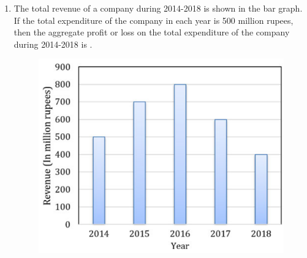 \documentclass[journal,12pt,onecolumn]{IEEEtran}
\theoremstyle{remark}
\begin{document}
\begin{enumerate}
		\item The total revenue of a company during 2014-2018 is shown in the bar graph. If the total expenditure of the company in each year is 500 million rupees, then the aggregate profit or loss  on the total expenditure of the company during 2014-2018 is \underline{\hspace{2cm}}.
		\begin{figure}[H]
			\centering
			\includegraphics[width=0.6\linewidth]{figs/3}
			\caption{}
			\label{fig:3}
		\end{figure}
		
		
		\hfill{}
		\begin{enumerate}
		\end{enumerate}
\end{enumerate}
\pagebreak

\\
\\
\end{document}
